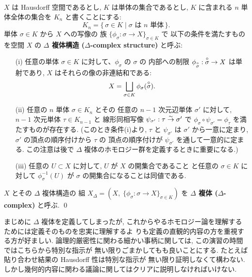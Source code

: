 \documentclass[12pt,twoside]{jarticle}
\begin{document}
\begin{definition}
\label{def:Delta-complex}
  $X$ は Hausdorff 空間であるとし,
  $K$ は単体の集合であるとし, 
  $K$ に含まれる $n$ 単体全体の集合を $K_n$ と書くことにする:
  \begin{equation*}
   K_n = \{\, \sigma\in K \mid \text{$\sigma$ は $n$ 単体} \,\}.
  \end{equation*}
  単体 $\sigma\in K$ から $X$ への写像の
  族 $\{\phi_\sigma:\sigma\to X\}_{\sigma\in K}$ で
  以下の条件を満たすものを空間 $X$ 
  の {\bf $\Delta$ 複体構造 ($\Delta$-complex structure)} と呼ぶ:
  \begin{enumerate}
  \item[(i)] 任意の単体 $\sigma\in K$ に対して、$\phi_\sigma$ の $\sigma$ の
    内部への制限 $\phi_{{\overset{\circ}{\sigma}}}:{\overset{\circ}{\sigma}}\to X$ は単射であり, %
    $X$ はそれらの像の非連結和である:
    \begin{equation*}
     X=\bigsqcup_{\sigma\in K}\phi_\sigma({\overset{\circ}{\sigma}}).
    \end{equation*}
  \item[(ii)] 任意の $n$ 単体 $\sigma\in K_n$ とその
    任意の $n-1$ 次元辺単体 $\sigma'$ に対して, 
    $n-1$ 次元単体 $\tau\in K_{n-1}$ と
    線形同相写像 $\psi_{\sigma'}:\tau\overset\sim\rightarrow\sigma'$ で 
    $\phi_\sigma\circ\psi_{\sigma'}=\phi_\tau$ を満たすものが存在する.
    (このとき条件(i)より, $\tau$ と $\psi_{\sigma'}$ は $\sigma'$ 
    から一意に定まり, $\sigma'$ の頂点の順序付けから $\tau$ の
    頂点の順序付けが $\psi_{\sigma'}$ を通して一意的に定まる.
    この注意は後で $\Delta$ 複体のホモロジー群を定義するときに重要になる.)
  \item[(iii)] 任意の $U\subset X$ に対して, $U$ が $X$ の開集合であること
    と任意の $\sigma\in K$ に対して $\phi_\sigma^{-1}(U)$ 
    が $\sigma$ の開集合になることは同値である. 
  \end{enumerate}
  $X$ とその $\Delta$ 複体構造の
  組 $X_\Delta=(X,\; \{\phi_\sigma:\sigma\to X\}_{\sigma\in K})$ を
  {\bf $\Delta$ 複体 ($\Delta$-complex)} と呼ぶ. 
  \qed
\end{definition}

まじめに $\Delta$ 複体を定義してしまったが,
これからやるホモロジー論を理解するためには定義そのものを忠実に理解するよ
りも定義の直観的内容の方を重視する方が好ましい.
論理的厳密性に関わる細かい事柄に関しては, 
この演習の時間ではこちらから特別な指示が
無い限りごまかしてもも良いことにする.
たとえば貼り合わせ結果の Hausdorff 性は特別な指示が
無い限り証明しなくて構わない.
しかし幾何的内容に関わる議論に関してはクリアに説明しなければいけない.
\end{document}
